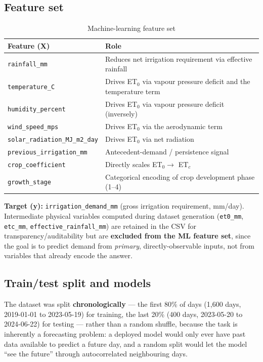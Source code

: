 \documentclass[11pt,a4paper]{article}
\begin{document}
\subsection{Feature set}

\begin{table}[H]
\centering
\caption{Machine-learning feature set}
\label{tab:features}
\begin{tabular}{@{}ll@{}}
\toprule
\textbf{Feature (X)} & \textbf{Role} \\
\midrule
\texttt{rainfall\_mm} & Reduces net irrigation requirement via effective rainfall \\
\texttt{temperature\_C} & Drives ET$_0$ via vapour pressure deficit and the temperature term \\
\texttt{humidity\_percent} & Drives ET$_0$ via vapour pressure deficit (inversely) \\
\texttt{wind\_speed\_mps} & Drives ET$_0$ via the aerodynamic term \\
\texttt{solar\_radiation\_MJ\_m2\_day} & Drives ET$_0$ via net radiation \\
\texttt{previous\_irrigation\_mm} & Antecedent-demand / persistence signal \\
\texttt{crop\_coefficient} & Directly scales ET$_0 \rightarrow$ ET$_c$ \\
\texttt{growth\_stage} & Categorical encoding of crop development phase (1--4) \\
\bottomrule
\end{tabular}
\end{table}

\noindent\textbf{Target (y):} \texttt{irrigation\_demand\_mm} (gross irrigation
requirement, mm/day). Intermediate physical variables computed during dataset
generation (\texttt{et0\_mm}, \texttt{etc\_mm}, \texttt{effective\_rainfall\_mm})
are retained in the CSV for transparency/auditability but are
\textbf{excluded from the ML feature set}, since the goal is to predict demand
from \emph{primary}, directly-observable inputs, not from variables that
already encode the answer.

\subsection{Train/test split and models}

The dataset was split \textbf{chronologically} --- the first 80\% of days
(1{,}600 days, 2019-01-01 to 2023-05-19) for training, the last 20\% (400
days, 2023-05-20 to 2024-06-22) for testing --- rather than a random shuffle,
because the task is inherently a forecasting problem: a deployed model would
only ever have past data available to predict a future day, and a random split
would let the model ``see the future'' through autocorrelated neighbouring days.
\end{document}
